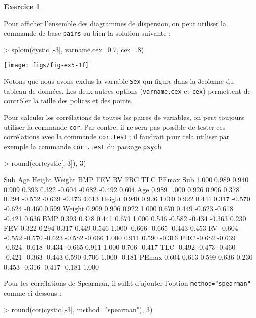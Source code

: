 \documentclass[11pt]{report}
\makeatletter
\theoremstyle{definition}
\newtheorem{exo}{Exercice}[chapter]
\newcommand{\foo}[1]{\texttt{#1}}
\newcommand{\cmd}[1]{\index{#1@\foo{#1}}}
\makeatother
\begin{document}
\begin{exo}
\begin{sol}
Pour afficher l'ensemble des diagrammes de dispersion, on peut utiliser la
commande de base \texttt{pairs} ou bien la solution suivante :
\begin{Schunk}
\begin{Sinput}
> splom(cystic[,-3], varname.cex=0.7, cex=.8)
\end{Sinput}
\end{Schunk}
\texttt{[image: figs/fig-ex5-1f]}
\cmd{splom}

Notons que nous avons exclus la variable \texttt{Sex} qui figure dans la
3\ieme colonne du tableau de données. Les deux autres options
(\texttt{varname.cex} et \texttt{cex}) permettent de contrôler la taille des
polices et des points.

Pour calculer les corrélations de toutes les paires de variables, on peut
toujours utiliser la commande \texttt{cor}. Par contre, il ne sera pas
possible de tester ces corrélations avec la commande \texttt{cor.test} ; il
faudrait pour cela utiliser par exemple la commande \texttt{corr.test} du
package \texttt{psych}.
\begin{Schunk}
\begin{Sinput}
> round(cor(cystic[,-3]), 3)
\end{Sinput}
\begin{Soutput}
          Sub    Age Height Weight    BMP    FEV     RV    FRC    TLC  PEmax
Sub     1.000  0.989  0.940  0.909  0.393  0.322 -0.604 -0.682 -0.492  0.604
Age     0.989  1.000  0.926  0.906  0.378  0.294 -0.552 -0.639 -0.473  0.613
Height  0.940  0.926  1.000  0.922  0.441  0.317 -0.570 -0.624 -0.460  0.599
Weight  0.909  0.906  0.922  1.000  0.670  0.449 -0.623 -0.618 -0.421  0.636
BMP     0.393  0.378  0.441  0.670  1.000  0.546 -0.582 -0.434 -0.363  0.230
FEV     0.322  0.294  0.317  0.449  0.546  1.000 -0.666 -0.665 -0.443  0.453
RV     -0.604 -0.552 -0.570 -0.623 -0.582 -0.666  1.000  0.911  0.590 -0.316
FRC    -0.682 -0.639 -0.624 -0.618 -0.434 -0.665  0.911  1.000  0.706 -0.417
TLC    -0.492 -0.473 -0.460 -0.421 -0.363 -0.443  0.590  0.706  1.000 -0.181
PEmax   0.604  0.613  0.599  0.636  0.230  0.453 -0.316 -0.417 -0.181  1.000
\end{Soutput}
\end{Schunk}
\cmd{round}\cmd{cor}
Pour les corrélations de Spearman, il suffit d'ajouter l'option
\verb|method="spearman"| comme ci-dessous :
\begin{Schunk}
\begin{Sinput}
> round(cor(cystic[,-3], method="spearman"), 3)
\end{Sinput}

\end{Schunk}
\end{sol}
\end{exo}
\end{document}
